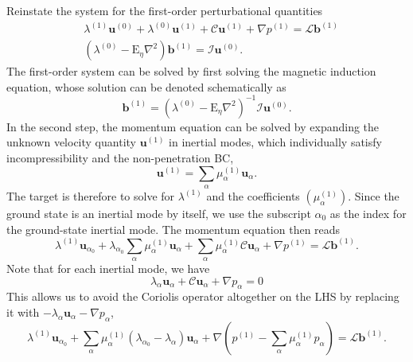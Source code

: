 Reinstate the system for the first-order perturbational quantities
%
\begin{equation}
    \begin{aligned}
        &\lambda^{(1)} \mathbf{u}^{(0)} + \lambda^{(0)} \mathbf{u}^{(1)} + \mathcal{C} \mathbf{u}^{(1)} + \nabla p^{(1)} = \mathcal{L} \mathbf{b}^{(1)} \\
        &\left(\lambda^{(0)} - \mathrm{E}_\eta \nabla^2 \right) \mathbf{b}^{(1)} = \mathcal{I} \mathbf{u}^{(0)}.
    \end{aligned}
\end{equation}
%
The first-order system can be solved by first solving the magnetic induction equation, whose solution can be denoted schematically as
%
\begin{equation}
    \mathbf{b}^{(1)} = (\lambda^{(0)} - \mathrm{E}_\eta \nabla^2)^{-1} \mathcal{I} \mathbf{u}^{(0)}.
\end{equation}
%
In the second step, the momentum equation can be solved by expanding the unknown velocity quantity $\mathbf{u}^{(1)}$ in inertial modes, which individually satisfy incompressibility and the non-penetration BC,
%
\begin{equation}
    \mathbf{u}^{(1)} = \sum_\alpha \mu_\alpha^{(1)} \mathbf{u}_\alpha.
\end{equation}
%
The target is therefore to solve for $\lambda^{(1)}$ and the coefficients $(\mu_\alpha^{(1)})$. Since the ground state is an inertial mode by itself, we use the subscript $\alpha_0$ as the index for the ground-state inertial mode. The momentum equation then reads
%
\begin{equation}
    \lambda^{(1)} \mathbf{u}_{\alpha_0} + \lambda_{\alpha_0} \sum_\alpha \mu_\alpha^{(1)} \mathbf{u}_\alpha + \sum_\alpha \mu_\alpha^{(1)} \mathcal{C} \mathbf{u}_{\alpha} + \nabla p^{(1)} = \mathcal{L} \mathbf{b}^{(1)}.
\end{equation}
%
Note that for each inertial mode, we have
%
\begin{equation}
    \lambda_\alpha \mathbf{u}_\alpha + \mathcal{C} \mathbf{u}_\alpha + \nabla p_\alpha = 0
\end{equation}
%
This allows us to avoid the Coriolis operator altogether on the LHS by replacing it with $- \lambda_\alpha \mathbf{u}_\alpha - \nabla p_\alpha$,
%
\begin{equation}
    \lambda^{(1)} \mathbf{u}_{\alpha_0} + \sum_\alpha \mu_\alpha^{(1)} \left(\lambda_{\alpha_0} - \lambda_{\alpha}\right) \mathbf{u}_\alpha + \nabla \left(p^{(1)} - \sum_\alpha \mu_\alpha^{(1)} p_\alpha \right) = \mathcal{L} \mathbf{b}^{(1)}.
\end{equation}

